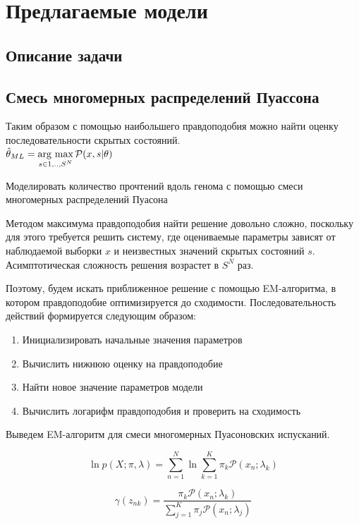 \documentclass{matmex-diploma}
\begin{document}
\section{Предлагаемые модели}
\subsection{Описание задачи}
\subsection{Смесь многомерных распределений Пуассона}

Таким образом с помощью наибольшего правдоподобия можно найти оценку последовательности скрытых состояний.
\\
\newcommand{\argmax}{\mathop{\rm arg~max}\limits}
$\hat{\theta}_{ML} = \argmax_{s \in {1,..,S}^N} \mathcal{P}(x,s|\theta)$

Моделировать количество прочтений вдоль генома с помощью смеси многомерных распределений Пуасона

Методом максимума правдоподобия найти решение довольно сложно, поскольку для этого требуется решить систему, где оцениваемые параметры зависят от наблюдаемой выборки $x$ и неизвестных значений скрытых состояний $s$. Асимптотическая сложность решения возрастет в $S^N$ раз.

Поэтому, будем искать приближенное решение с помощью EM-алгоритма, в котором правдоподобие оптимизируется до сходимости. Последовательность действий формируется следующим образом\cite{book:Bishop}:
\begin{enumerate}
\item
Инициализировать начальные значения параметров
\item
Вычислить нижнюю оценку на правдоподобие
\item
Найти новое значение параметров модели
\item
Вычислить логарифм правдоподобия и проверить на сходимость
\end{enumerate}

Выведем EM-алгоритм для смеси многомерных Пуасоновских испусканий.

\begin{equation}
\ln p(X;\pi,\lambda) = \sum_{n=1}^N \ln{\sum_{k=1}^K} \pi_k \mathcal{P}(x_n;\lambda_k)
\end{equation}

\begin{equation}
\gamma(z_{nk}) = \frac{\pi_k\mathcal{P}(x_n;\lambda_k)}{\sum_{j=1}^K\pi_j\mathcal{P}(x_n;\lambda_j)}
\end{equation}
\end{document}
